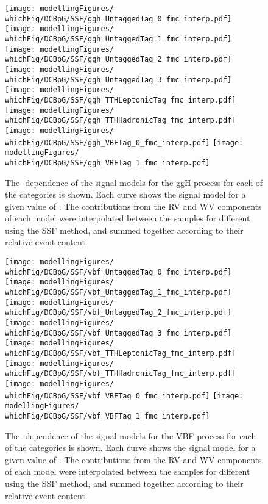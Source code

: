 \begin{figure}[htp!]
\centering
\texttt{[image: modellingFigures/\\whichFig/DCBpG/SSF/ggh\_UntaggedTag\_0\_fmc\_interp.pdf]} 
\texttt{[image: modellingFigures/\\whichFig/DCBpG/SSF/ggh\_UntaggedTag\_1\_fmc\_interp.pdf]} \\ 
\texttt{[image: modellingFigures/\\whichFig/DCBpG/SSF/ggh\_UntaggedTag\_2\_fmc\_interp.pdf]} 
\texttt{[image: modellingFigures/\\whichFig/DCBpG/SSF/ggh\_UntaggedTag\_3\_fmc\_interp.pdf]} \\
\texttt{[image: modellingFigures/\\whichFig/DCBpG/SSF/ggh\_TTHLeptonicTag\_fmc\_interp.pdf]} 
\texttt{[image: modellingFigures/\\whichFig/DCBpG/SSF/ggh\_TTHHadronicTag\_fmc\_interp.pdf]} \\ 
\texttt{[image: modellingFigures/\\whichFig/DCBpG/SSF/ggh\_VBFTag\_0\_fmc\_interp.pdf]} 
\texttt{[image: modellingFigures/\\whichFig/DCBpG/SSF/ggh\_VBFTag\_1\_fmc\_interp.pdf]} \\
\caption{The \mH-dependence of the signal models for the ggH process for each of the categories is shown. Each curve shows the signal model for a given value of \mH. The contributions from the RV and WV components of each model were interpolated between the samples for different \mH using the SSF method, and summed together according to their relative event content.}

\label{fig:model:sig_interpolation_ggh}
\end{figure}

\begin{figure}[htp!]
\centering
\texttt{[image: modellingFigures/\\whichFig/DCBpG/SSF/vbf\_UntaggedTag\_0\_fmc\_interp.pdf]} 
\texttt{[image: modellingFigures/\\whichFig/DCBpG/SSF/vbf\_UntaggedTag\_1\_fmc\_interp.pdf]} \\ 
\texttt{[image: modellingFigures/\\whichFig/DCBpG/SSF/vbf\_UntaggedTag\_2\_fmc\_interp.pdf]} 
\texttt{[image: modellingFigures/\\whichFig/DCBpG/SSF/vbf\_UntaggedTag\_3\_fmc\_interp.pdf]} \\
\texttt{[image: modellingFigures/\\whichFig/DCBpG/SSF/vbf\_TTHLeptonicTag\_fmc\_interp.pdf]} 
\texttt{[image: modellingFigures/\\whichFig/DCBpG/SSF/vbf\_TTHHadronicTag\_fmc\_interp.pdf]} \\ 
\texttt{[image: modellingFigures/\\whichFig/DCBpG/SSF/vbf\_VBFTag\_0\_fmc\_interp.pdf]} 
\texttt{[image: modellingFigures/\\whichFig/DCBpG/SSF/vbf\_VBFTag\_1\_fmc\_interp.pdf]} \\
\caption{The \mH-dependence of the signal models for the VBF process for each of the categories is shown. Each curve shows the signal model for a given value of \mH. The contributions from the RV and WV components of each model were interpolated between the samples for different \mH using the SSF method, and summed together according to their relative event content.}

\label{fig:model:sig_interpolation_vbf}
\end{figure}

